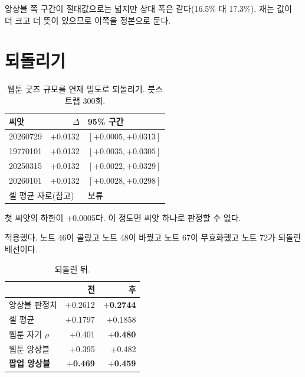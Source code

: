 \documentclass[10pt]{article}
\begin{document}
앙상블 쪽 구간이 절대값으로는 넓지만 상대 폭은 같다(16.5\% 대 17.3\%). 재는
값이 더 크고 더 뜻이 있으므로 이쪽을 정본으로 둔다.

\section{되돌리기}

\begin{table}[t]
\centering\tsize
\caption{웹툰 굿즈 규모를 연재 밀도로 되돌리기. 붓스트랩 300회.}
\begin{tabular}{lrl}
\toprule
씨앗 & $\Delta$ & 95\% 구간 \\
\midrule
20260729 & $+$0.0132 & $[+0.0005, +0.0313]$ \\
19770101 & $+$0.0132 & $[+0.0035, +0.0305]$ \\
20250315 & $+$0.0132 & $[+0.0022, +0.0329]$ \\
20260101 & $+$0.0132 & $[+0.0028, +0.0298]$ \\
\midrule
\multicolumn{2}{l}{셀 평균 자로(참고)} & 보류 \\
\bottomrule
\end{tabular}
\end{table}

첫 씨앗의 하한이 $+$0.0005다. 이 정도면 씨앗 하나로 판정할 수 없다.


적용했다. 노트 46이 골랐고 노트 48이 바꿨고 노트 67이 무효화했고 노트 72가
되돌린 배선이다.

\begin{table}[t]
\centering\tsize
\caption{되돌린 뒤.}
\begin{tabular}{lrr}
\toprule
& 전 & 후 \\
\midrule
앙상블 판정치 & $+$0.2612 & \textbf{$+$0.2744} \\
셀 평균 & $+$0.1797 & $+$0.1858 \\
웹툰 자기 $\rho$ & $+$0.401 & \textbf{$+$0.480} \\
웹툰 앙상블 & $+$0.395 & $+$0.482 \\
\textbf{팝업 앙상블} & \textbf{$+$0.469} & \textbf{$+$0.459} \\
\bottomrule
\end{tabular}
\end{table}
\end{document}
